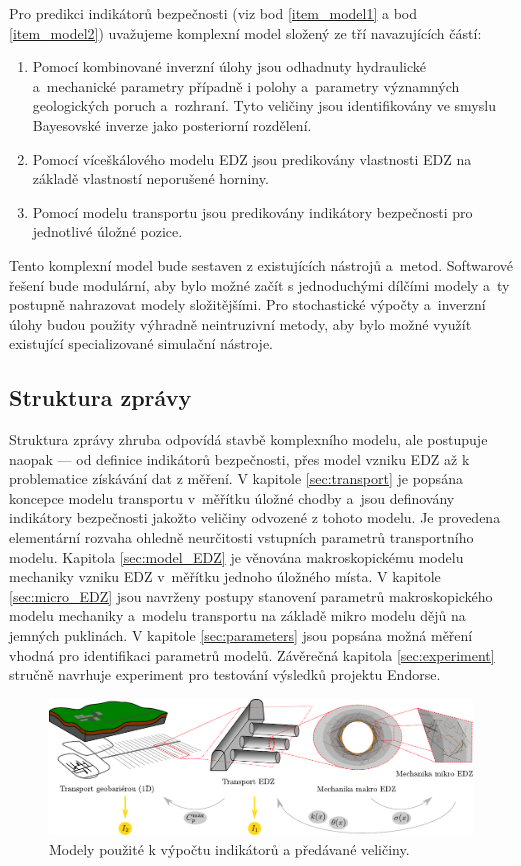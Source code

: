 \documentclass{article}
\begin{document}
Pro predikci indikátorů bezpečnosti (viz bod \ref{item_model1} 
a bod \ref{item_model2}) uvažujeme komplexní model složený ze tří navazujících částí: 
    \begin{enumerate}
    \item Pomocí kombinované inverzní úlohy jsou odhadnuty hydraulické a~mechanické
     parametry  případně i polohy a~parametry významných geologických poruch a~rozhraní. 
     Tyto veličiny jsou identifikovány ve smyslu Bayesovské inverze jako posteriorní rozdělení.
    \item Pomocí víceškálového modelu EDZ jsou predikovány vlastnosti EDZ na základě vlastností neporušené horniny.
    \item Pomocí modelu transportu jsou predikovány indikátory bezpečnosti pro jednotlivé úložné pozice.
    \end{enumerate}

Tento komplexní model bude sestaven z existujících nástrojů a~metod. Softwarové řešení bude modulární, aby bylo možné začít s
jednoduchými dílčími modely a~ty postupně nahrazovat modely složitějšími. Pro stochastické výpočty a~inverzní úlohy budou 
použity výhradně neintruzivní metody, aby bylo možné využít existující specializované simulační nástroje.

    
\subsection{Struktura zprávy}
Struktura zprávy zhruba odpovídá stavbě komplexního modelu, ale postupuje naopak --- od definice indikátorů bezpečnosti,
přes model vzniku EDZ až k problematice získávání dat z měření. 
V kapitole \ref{sec:transport} je popsána koncepce modelu transportu v~měřítku úložné chodby a~jsou
definovány indikátory bezpečnosti jakožto veličiny odvozené z tohoto modelu. Je provedena elementární rozvaha ohledně 
neurčitosti vstupních parametrů transportního modelu. Kapitola
\ref{sec:model_EDZ} je věnována makroskopickému modelu mechaniky vzniku EDZ v~měřítku jednoho úložného místa. 
V kapitole \ref{sec:micro_EDZ} jsou navrženy postupy stanovení parametrů makroskopického modelu mechaniky a~modelu transportu 
na základě mikro modelu dějů na jemných puklinách.
V kapitole \ref{sec:parameters} jsou popsána možná měření vhodná pro identifikaci 
parametrů modelů. Závěrečná kapitola \ref{sec:experiment} stručně navrhuje experiment pro 
testování výsledků projektu Endorse.

\begin{figure}[h]
    \centering
    \includegraphics[width=\textwidth]{graphics/main_scheme.pdf}
    \caption{Modely použité k výpočtu indikátorů a předávané veličiny.}
    \label{fig:main_schema}
\end{figure}
\end{document}
